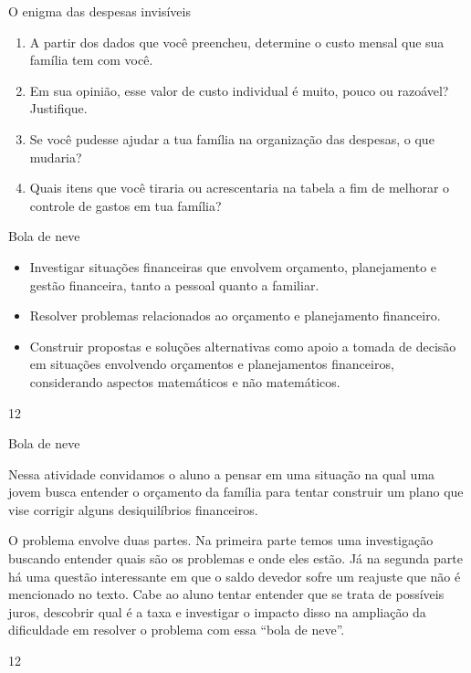 \begin{task}{O enigma das despesas invisíveis}
\begin{enumerate}
\item A partir dos dados que você preencheu, determine o custo mensal que sua família tem com você.
\item Em sua opinião, esse valor de custo individual é muito, pouco ou razoável? Justifique.
\item Se você pudesse ajudar a tua família na organização das despesas, o que mudaria?
\item Quais itens que você tiraria ou acrescentaria na tabela a fim de melhorar o controle de gastos em tua família?

\end{enumerate}

\end{task}

\clearpage
\begin{objectives}{Bola de neve}
{
\begin{itemize}
\item Investigar situações financeiras que envolvem orçamento, planejamento e gestão financeira, tanto a pessoal quanto a familiar.
\item Resolver problemas relacionados ao orçamento e planejamento financeiro. 
\item Construir propostas e soluções alternativas como apoio a tomada de decisão em situações envolvendo orçamentos e planejamentos financeiros, considerando aspectos matemáticos e não matemáticos. 
\end{itemize}
}{1}{2}
\end{objectives}
\begin{sugestions}{Bola de neve}
{
Nessa atividade convidamos o aluno a pensar em uma situação na qual uma jovem busca entender o orçamento da família para tentar construir um plano que vise corrigir alguns desiquilíbrios financeiros.

O problema envolve duas partes. Na primeira parte temos uma investigação buscando entender quais são os problemas e onde eles estão. Já na segunda parte há uma questão interessante em que o saldo devedor sofre um reajuste que não é mencionado no texto. Cabe ao aluno tentar entender que se trata de possíveis juros, descobrir qual é a taxa e investigar o impacto disso na ampliação da dificuldade em resolver o problema com essa “bola de neve”. 

}{1}{2}
\end{sugestions}
